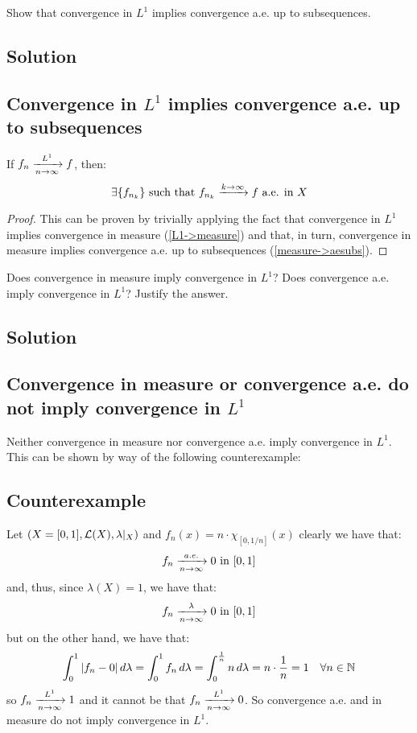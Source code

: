 
\question
Show that convergence in $L^1$ implies convergence a.e. up to subsequences.

\subsection*{Solution}

\subsection{Convergence in \texorpdfstring{$L^1$}{L1} implies convergence a.e. up to subsequences}
If $f_n \xrightarrow[n\to\infty]{L^1} f$, then:
\[
    \exists \{ f_{n_k} \} \text{ such that } f_{n_k} \xrightarrow{k\to\infty} f \text{ a.e. in } X
\]

\begin{proof}
    This can be proven by trivially applying the fact that convergence in $L^1$ implies convergence in measure (\ref{L1->measure}) and that, in turn, convergence in measure implies convergence a.e. up to subsequences (\ref{measure->aesubs}).
\end{proof}


\question
Does convergence in measure imply convergence in $L^1$? Does convergence a.e. imply convergence in $L^1$? Justify the answer.

\subsection*{Solution}

\subsection{Convergence in measure or convergence a.e. do not imply convergence in \texorpdfstring{$L^1$}{L1}}
Neither convergence in measure nor convergence a.e. imply convergence in $L^1$. This can be shown by way of the following counterexample:

\subsection{Counterexample}
Let $(X=[0,1], \mathcal{L}(X), \lambda|_X)$ and $f_n(x) = n \cdot \chi_{[0,1/n]}(x)$ clearly we have that:
\[
    f_n \xrightarrow[n\to\infty]{a.e.} 0 \text{ in } [0,1]    
\]
and, thus, since $\lambda(X)=1$, we have that:
\[
    f_n \xrightarrow[n\to\infty]{\lambda} 0 \text{ in } [0,1]
\]
but on the other hand, we have that:
\[
    \int_0^1 |f_n-0| \, d\lambda = \int_0^1 f_n \, d\lambda = \int_0^{\frac{1}{n}} n \, d\lambda = n \cdot \frac{1}{n} = 1 \quad \forall n \in \mathbb{N}    
\]
so $f_n \xrightarrow[n\to\infty]{L^1} 1$ and it cannot be that $f_n \xrightarrow[n\to\infty]{L^1} 0$. So convergence a.e. and in measure do not imply convergence in $L^1$.

